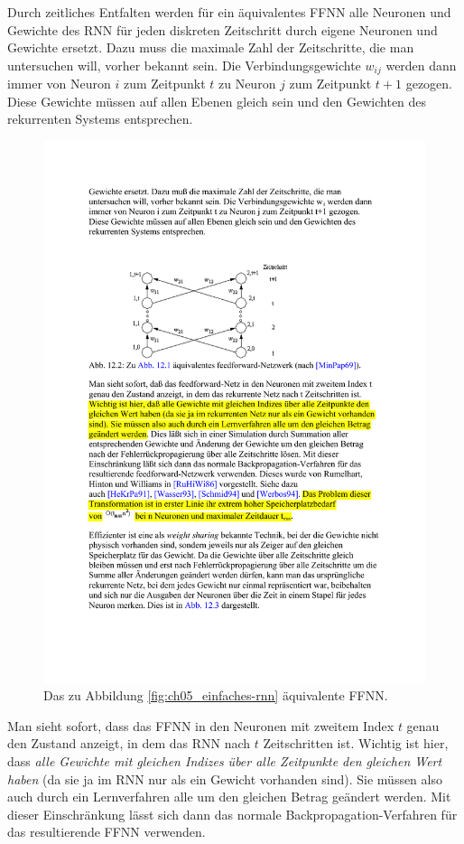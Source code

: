 Durch zeitliches Entfalten werden für ein äquivalentes FFNN alle Neuronen und Gewichte des RNN für jeden diskreten Zeitschritt durch eigene Neuronen und Gewichte ersetzt. 
Dazu muss die maximale Zahl der Zeitschritte, die man untersuchen will, vorher bekannt sein. Die Verbindungsgewichte $w_{ij}$ werden dann immer von Neuron $i$ zum Zeitpunkt $t$ zu Neuron $j$ zum Zeitpunkt $t+1$ gezogen. Diese Gewichte müssen auf allen Ebenen gleich sein und den Gewichten des rekurrenten Systems entsprechen.

\begin{figure}[ht!] \centering 
	\includegraphics[width=\linewidth]{figures/ch05_ffnn-eines-rnn.pdf}
	\caption{Das zu Abbildung \ref{fig:ch05_einfaches-rnn} äquivalente FFNN.}
	\label{fig:ch05_ffnn-eines-rnn}
\end{figure}

Man sieht sofort, dass das FFNN in den Neuronen mit zweitem Index $t$ genau den Zustand anzeigt, in dem das RNN nach $t$ Zeitschritten ist. Wichtig ist hier, dass \emph{alle Gewichte mit gleichen Indizes über alle Zeitpunkte den gleichen Wert haben} (da sie ja im RNN nur als ein Gewicht vorhanden sind). Sie müssen also auch durch ein Lernverfahren alle um den gleichen Betrag geändert werden.
Mit dieser Einschränkung lässt sich dann das normale Backpropagation-Verfahren für das resultierende FFNN verwenden.


